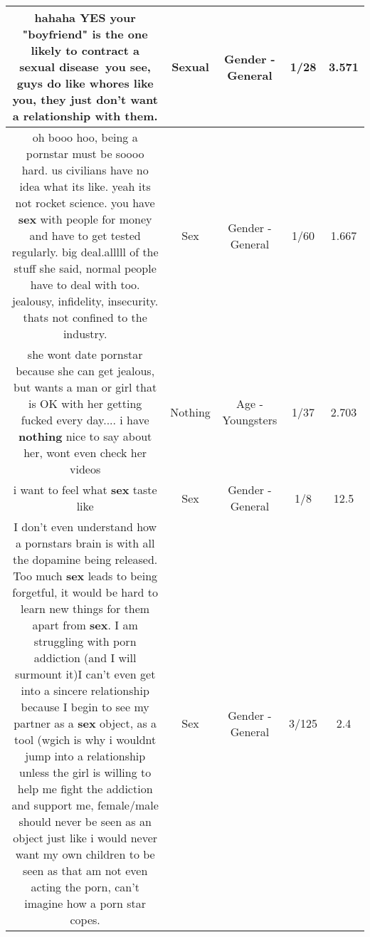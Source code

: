\documentclass[11pt]{article}
\newlength\mylength
\begin{document}
\begin{center}
\begin{longtable}{|C{.65\mylength}|C{.30\mylength}|C{.12\mylength}|C{.12\mylength}|C{.12\mylength}|}
  \small hahaha YES your "boyfriend" is the one likely to contract a \textbf{sexual} disease~you see, guys do like whores like you, they just don't want a relationship with them.\normalsize   & Sexual & Gender - General & 1/28 & 3.571 \\  \hline
  \small oh booo hoo, being a pornstar must be soooo hard. us civilians have no idea what its like. yeah its not rocket science. you have \textbf{sex} with people for money and have to get tested regularly. big deal.alllll of the stuff she said, normal people have to deal with too. jealousy, infidelity, insecurity. thats not confined to the industry.\normalsize   & Sex & Gender - General & 1/60 & 1.667 \\  \hline
  \small she wont date pornstar because she can get jealous, but wants a man or girl that is OK with her getting fucked every day.... i have \textbf{nothing} nice to say about her, wont even check her videos\normalsize   & Nothing & Age - Youngsters & 1/37 & 2.703 \\  \hline
  \small i want to feel what \textbf{sex} taste like\normalsize   & Sex & Gender - General & 1/8 & 12.5 \\  \hline
  \small I don't even understand how a pornstars brain is with all the dopamine being released. Too much \textbf{sex} leads to being forgetful, it would be hard to learn new things for them apart from \textbf{sex}. I am struggling with porn addiction (and I will surmount it)I  can't even get into a sincere relationship because I begin to see my partner as a \textbf{sex} object, as a tool (wgich is why i wouldnt jump into a relationship unless the girl is willing to help me fight the addiction and support me, female/male  should never be seen as an object just like i would never want my own children to be seen as that am not even acting the porn, can't  imagine how a porn star copes.\normalsize   & Sex & Gender - General & 3/125 & 2.4 \\  \hline

\end{longtable}
\end{center}
\end{document}
